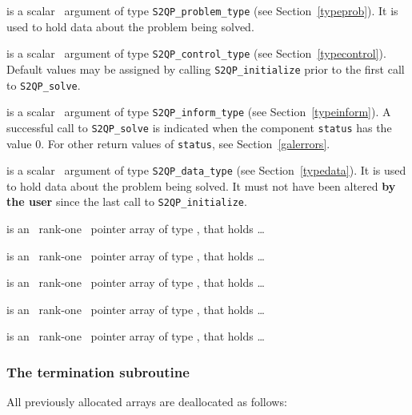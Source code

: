 \documentclass{galahad}
\newcommand{\packagename}{S2QP}
\begin{document}
\vspace*{-3mm}
\begin{description}
 is a scalar \intentinout\ argument of type 
{\tt \packagename\_problem\_type}
(see Section~\ref{typeprob}). 
It is used to hold data about the problem being solved.

 is a scalar \intentin\ argument of type 
{\tt \packagename\_control\_type}
(see Section~\ref{typecontrol}). Default values may be assigned by calling 
{\tt \packagename\_initialize} 
prior to the first call to 
{\tt \packagename\_solve}.

 is a scalar \intentout\ argument of type 
{\tt \packagename\_inform\_type}
(see Section~\ref{typeinform}). A successful call to
{\tt \packagename\_solve}
is indicated when the  component {\tt status} has the value 0. 
For other return values of {\tt status}, see Section~\ref{galerrors}.

 is a scalar \intentinout\ argument of type 
{\tt \packagename\_data\_type}
(see Section~\ref{typedata}). It is used to hold data about the problem being 
solved. It must not have been altered {\bf by the user} since the last call to 
{\tt \packagename\_initialize}.


 is an \optional\ rank-one \intentin\ pointer array of type 
 \realdp,  that holds \ldots

 is an \optional\ rank-one \intentin\ pointer array of type 
 \realdp,  that holds \ldots

 is an \optional\ rank-one \intentin\ pointer array of type 
 \realdp,  that holds \ldots

 is an \optional\ rank-one \intentin\ pointer array of type 
 \realdp,  that holds \ldots

 is an \optional\ rank-one \intentin\ pointer array of type 
 \realdp,  that holds \ldots

\end{description}


\subsubsection{The  termination subroutine}
All previously allocated arrays are deallocated as follows:
\vspace*{1mm}
\end{document}
